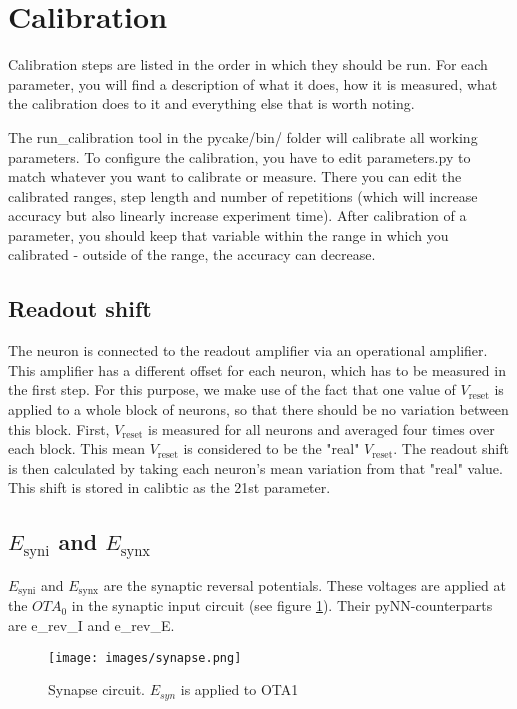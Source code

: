 \documentclass[12pt,a4paper,bibliography=totocnumbered,listof=totocnumbered]{scrartcl}
\begin{document}
\section{Calibration}
Calibration steps are listed in the order in which they should be run.
For each parameter, you will find a description of what it does, how it is measured, what the calibration does to it and everything else that is worth noting.

The run\_calibration tool in the pycake/bin/ folder will calibrate all working parameters.
To configure the calibration, you have to edit parameters.py to match whatever you want to calibrate or measure.
There you can edit the calibrated ranges, step length and number of repetitions (which will increase accuracy but also linearly increase experiment time).
After calibration of a parameter, you should keep that variable within the range in which you calibrated - outside of the range, the accuracy can decrease.

\subsection{Readout shift}
The neuron is connected to the readout amplifier via an operational amplifier.
This amplifier has a different offset for each neuron, which has to be measured in the first step.
For this purpose, we make use of the fact that one value of $V_\text{reset}$ is applied to a whole block of neurons, so that there should be no variation between this block.
First, $V_\text{reset}$ is measured for all neurons and averaged four times over each block.
This mean $V_\text{reset}$ is considered to be the "real" $V_\text{reset}$.
The readout shift is then calculated by taking each neuron's mean variation from that "real" value.
This shift is stored in calibtic as the 21st parameter.

\subsection{$E_\text{syni}$ and $E_\text{synx}$}
$E_\text{syni}$ and $E_\text{synx}$ are the synaptic reversal potentials. 
These voltages are applied at the $OTA_0$ in the synaptic input circuit (see figure \ref{figure:synapse}). 
Their pyNN-counterparts are e\_rev\_I and e\_rev\_E.

\begin{figure}[h]
\begin{center}
\texttt{[image: images/synapse.png]}
\caption{Synapse circuit. $E_{syn}$ is applied to OTA1}
\label{figure:synapse}
\end{center}
\end{figure}
\end{document}
